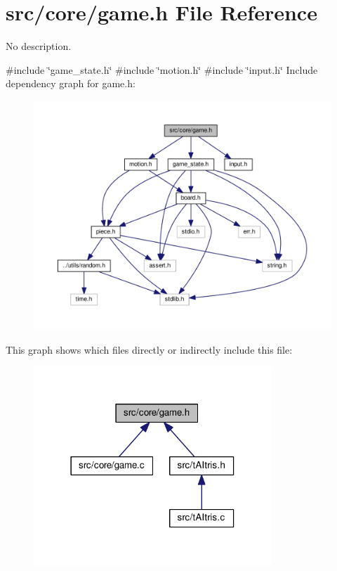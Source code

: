 \section{src/core/game.h File Reference}
\label{game_8h}


No description.  


{\ttfamily \#include \char`\"{}game\+\_\+state.\+h\char`\"{}}\newline
{\ttfamily \#include \char`\"{}motion.\+h\char`\"{}}\newline
{\ttfamily \#include \char`\"{}input.\+h\char`\"{}}\newline
Include dependency graph for game.\+h\+:
\nopagebreak
\begin{figure}[H]
\begin{center}
\leavevmode
\includegraphics[width=350pt]{game_8h__incl}
\end{center}
\end{figure}
This graph shows which files directly or indirectly include this file\+:
\nopagebreak
\begin{figure}[H]
\begin{center}
\leavevmode
\includegraphics[width=254pt]{game_8h__dep__incl}
\end{center}
\end{figure}
